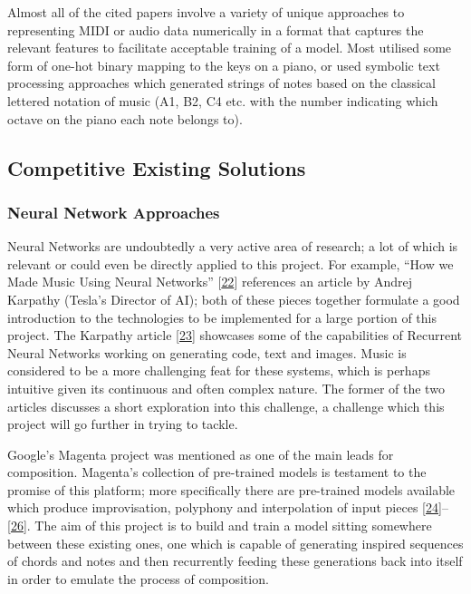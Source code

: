 \documentclass[12pt,]{article}
\begin{document}
Almost all of the cited papers involve a variety of unique approaches to
representing MIDI or audio data numerically in a format that captures
the relevant features to facilitate acceptable training of a model. Most
utilised some form of one-hot binary mapping to the keys on a piano, or
used symbolic text processing approaches which generated strings of
notes based on the classical lettered notation of music (A1, B2, C4 etc.
with the number indicating which octave on the piano each note belongs
to).

\hypertarget{competitive-existing-solutions}{%
\subsection{Competitive Existing
Solutions}\label{competitive-existing-solutions}}

\hypertarget{neural-network-approaches}{%
\subsubsection{Neural Network
Approaches}\label{neural-network-approaches}}

Neural Networks are undoubtedly a very active area of research; a lot of
which is relevant or could even be directly applied to this project. For
example, ``How we Made Music Using Neural Networks''
{[}\protect\hyperlink{ref-alextavgen}{22}{]} references an article by
Andrej Karpathy (Tesla's Director of AI); both of these pieces together
formulate a good introduction to the technologies to be implemented for
a large portion of this project. The Karpathy article
{[}\protect\hyperlink{ref-karpathy}{23}{]} showcases some of the
capabilities of Recurrent Neural Networks working on generating code,
text and images. Music is considered to be a more challenging feat for
these systems, which is perhaps intuitive given its continuous and often
complex nature. The former of the two articles discusses a short
exploration into this challenge, a challenge which this project will go
further in trying to tackle.

Google's Magenta project was mentioned as one of the main leads for
composition. Magenta's collection of pre-trained models is testament to
the promise of this platform; more specifically there are pre-trained
models available which produce improvisation, polyphony and
interpolation of input pieces
{[}\protect\hyperlink{ref-magentaimprov}{24}{]}--{[}\protect\hyperlink{ref-magentapolyphony}{26}{]}.
The aim of this project is to build and train a model sitting somewhere
between these existing ones, one which is capable of generating inspired
sequences of chords and notes and then recurrently feeding these
generations back into itself in order to emulate the process of
composition.
\end{document}
